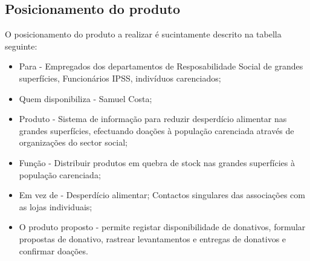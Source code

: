 \subsection{Posicionamento do produto}
O posicionamento do produto a realizar é sucintamente descrito na tabella seguinte:
\begin{itemize}
	\item Para - Empregados dos departamentos de Resposabilidade Social de grandes superfícies, Funcionários IPSS, indivíduos carenciados;
	\item Quem disponibiliza - Samuel Costa;
	\item Produto - Sistema de informação para reduzir desperdício alimentar nas grandes superfícies, efectuando doações à população carenciada através de organizações do sector social;
	\item Função - Distribuir produtos em quebra de stock nas grandes superfícies à população carenciada;
	\item Em vez de - Desperdício alimentar; Contactos singulares das associações com as lojas individuais;
	\item O produto proposto - permite registar disponibilidade de donativos, formular propostas de donativo, rastrear levantamentos e entregas de donativos e confirmar doações.
	
\end{itemize}

\clearpage